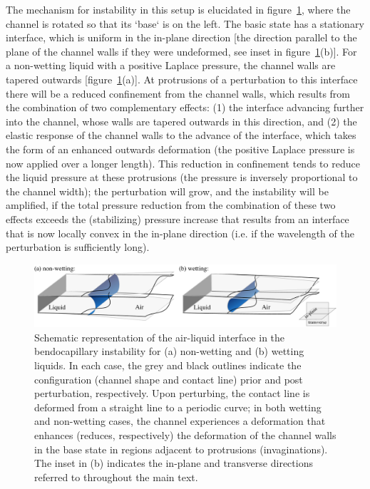 \documentclass{jfm}
\begin{document}
The mechanism for instability in this setup is elucidated in figure~\ref{fig:mechanism_schematic}, where the channel is rotated so that its `base` is on the left. The basic state has a stationary interface, which is uniform in the in-plane direction [the direction parallel to the plane of the channel walls if they were undeformed, see inset in figure~\ref{fig:mechanism_schematic}(b)]. For a non-wetting liquid with a positive Laplace pressure, the channel walls are tapered outwards [figure~\ref{fig:mechanism_schematic}(a)]. At protrusions of a perturbation to this interface there will be a reduced confinement from the channel walls, which results from the combination of two complementary effects: (1) the interface advancing further into the channel, whose walls are tapered outwards in this direction, and (2) the elastic response of the channel walls to the advance of the interface, which takes the form of an enhanced outwards deformation (the positive Laplace pressure is now applied over a longer length). This reduction in confinement tends to reduce the liquid pressure at these protrusions (the pressure is inversely proportional to the channel width); the perturbation will grow, and the instability will be amplified, if the total pressure reduction from the combination of these two effects exceeds the (stabilizing) pressure increase that results from an interface that is now locally convex in the in-plane direction (i.e. if the wavelength of the perturbation is sufficiently long).

\begin{figure}
    \centering
    \includegraphics[width=\textwidth]{figures/fig2_mechanism_schematic.pdf}
    \caption{Schematic representation of the air-liquid interface in the bendocapillary instability for (a) non-wetting and (b) wetting liquids. In each case, the grey and black outlines indicate the configuration (channel shape and contact line) prior and post perturbation, respectively. Upon perturbing, the contact line is deformed from a straight line to a periodic curve; in both wetting and non-wetting cases, the channel experiences a deformation that enhances (reduces, respectively) the deformation of the channel walls in the base state in regions adjacent to protrusions (invaginations). The inset in (b) indicates the in-plane and transverse directions referred to throughout the main text. }
    \label{fig:mechanism_schematic}
\end{figure}
\end{document}
